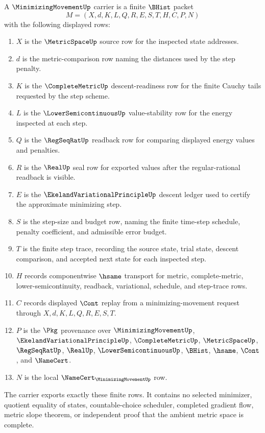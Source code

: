 \begin{definition}
\label{def:minimizing-movement-carrier}
A $\MinimizingMovementUp$ carrier is a finite $\BHist$ packet
$$
M=(X,d,K,L,Q,R,E,S,T,H,C,P,N)
$$
with the following displayed rows:
\begin{enumerate}
\item $X$ is the $\MetricSpaceUp$ source row for the inspected state addresses.
\item $d$ is the metric-comparison row naming the distances used by the step penalty.
\item $K$ is the $\CompleteMetricUp$ descent-readiness row for the finite Cauchy tails requested by the step scheme.
\item $L$ is the $\LowerSemicontinuousUp$ value-stability row for the energy inspected at each step.
\item $Q$ is the $\RegSeqRatUp$ readback row for comparing displayed energy values and penalties.
\item $R$ is the $\RealUp$ seal row for exported values after the regular-rational readback is visible.
\item $E$ is the $\EkelandVariationalPrincipleUp$ descent ledger used to certify the approximate minimizing step.
\item $S$ is the step-size and budget row, naming the finite time-step schedule, penalty coefficient, and admissible error budget.
\item $T$ is the finite step trace, recording the source state, trial state, descent comparison, and accepted next state for each inspected step.
\item $H$ records componentwise $\hsame$ transport for metric, complete-metric, lower-semicontinuity, readback, variational, schedule, and step-trace rows.
\item $C$ records displayed $\Cont$ replay from a minimizing-movement request through $X,d,K,L,Q,R,E,S,T$.
\item $P$ is the $\Pkg$ provenance over $\MinimizingMovementUp$, $\EkelandVariationalPrincipleUp$, $\CompleteMetricUp$, $\MetricSpaceUp$, $\RegSeqRatUp$, $\RealUp$, $\LowerSemicontinuousUp$, $\BHist$, $\hsame$, $\Cont$, and $\NameCert$.
\item $N$ is the local $\NameCert_{\MinimizingMovementUp}$ row.
\end{enumerate}
The carrier exports exactly these finite rows. It contains no selected minimizer, quotient equality of states, countable-choice scheduler, completed gradient flow, metric slope theorem, or independent proof that the ambient metric space is complete.
\end{definition}

